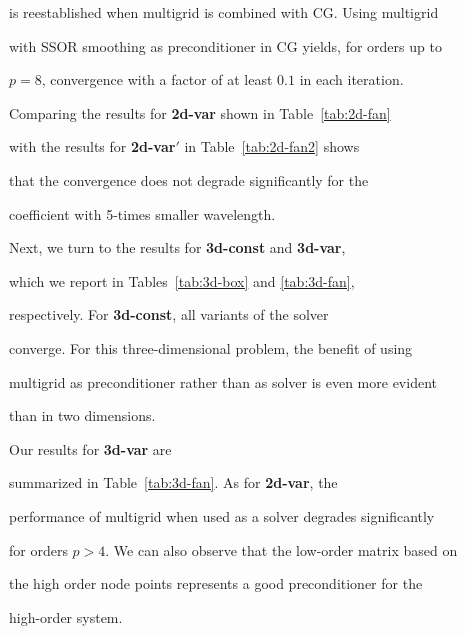 \documentclass[smallcondensed,final]{svjour3}     %
\begin{document}
is reestablished when multigrid is combined with CG. Using multigrid

with SSOR smoothing as preconditioner in CG yields, for orders up to

$p=8$, convergence with a factor of at least $0.1$ in each iteration.

Comparing the results for {\bf 2d-var} shown in Table~\ref{tab:2d-fan}

with the results for {\bf 2d-var$'$} in Table~\ref{tab:2d-fan2} shows

that the convergence does not degrade significantly for the

coefficient with 5-times smaller wavelength.







Next, we turn to the results for {\bf 3d-const} and {\bf 3d-var},

which we report in Tables~\ref{tab:3d-box} and \ref{tab:3d-fan},

respectively. For {\bf 3d-const}, all variants of the solver

converge. For this three-dimensional problem, the benefit of using

multigrid as preconditioner rather than as solver is even more evident

than in two dimensions.





Our results for {\bf 3d-var} are

summarized in Table~\ref{tab:3d-fan}. As for {\bf 2d-var}, the

performance of multigrid when used as a solver degrades significantly

for orders $p>4$. We can also observe that the low-order matrix based on

the high order node points represents a good preconditioner for the

high-order system. 

\end{document}
